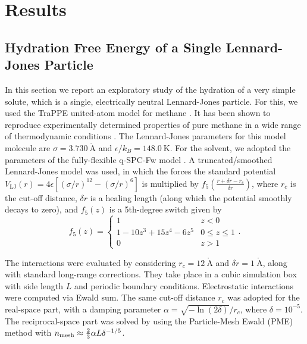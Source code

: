 \documentclass[
aip,
jcp,
reprint,
]{revtex4-1}
\renewcommand{\AA}{\mathring{A}}                       %
\begin{document}
\section{Results}
\label{sec:results}

\subsection{Hydration Free Energy of a Single Lennard-Jones Particle}
\label{sec:hydration free energy}

In this section we report an exploratory study of the hydration of a very simple solute, which is a single, electrically neutral Lennard-Jones particle.
For this, we used the TraPPE united-atom model for methane \cite{Siepmann_1998}.
It has been shown to reproduce experimentally determined properties of pure methane in a wide range of thermodynamic conditions \cite{Aimoli_2014}.
The Lennard-Jones parameters for this model molecule are $\sigma = 3.730~\mathrm{\AA}$ and $\epsilon/k_B = 148.0~\mathrm{K}$.
For the solvent, we adopted the parameters of the fully-flexible q-SPC-Fw model \cite{Paesani_2006}.
A truncated/smoothed Lennard-Jones model was used, in which the forces the standard potential $V_\mathrm{LJ}(r) = 4\epsilon[(\sigma/r)^{12}-(\sigma/r)^6]$ is multiplied by $f_5(\frac{r+\delta r-r_c}{\delta r})$, where $r_c$ is the cut-off distance, $\delta r$ is a healing length (along which the potential smoothly decays to zero), and $f_5(z)$ is a 5th-degree switch given by
\begin{equation}
\label{eq:swithing function}
f_5(z) = \begin{cases}
1 & z < 0 \\
1 - 10 z^3 + 15 z^4 - 6 z^5 & 0 \leq z \leq 1 \\
0 & z > 1
\end{cases}.
\end{equation}

The interactions were evaluated by considering $r_c = 12~\mathrm{\AA}$ and $\delta r = 1~\mathrm{\AA}$, along with standard long-range corrections.
They take place in a cubic simulation box with side length $L$ and periodic boundary conditions.
Electrostatic interactions were computed via Ewald sum.
The same cut-off distance $r_c$ was adopted for the real-space part, with a damping parameter $\alpha = {\sqrt{-\ln(2\delta)}}/{r_c}$, where $\delta = 10^{-5}$.
The reciprocal-space part was solved by using the Particle-Mesh Ewald (PME) method \cite{Darden_1993} with $n_{\rm mesh} \approx \frac{2}{3} \alpha L \delta^{-1/5}$.
\end{document}
